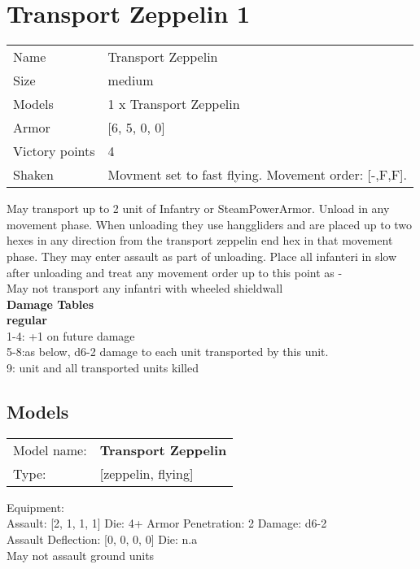 \clearpage

\section{ Transport Zeppelin 1 }

\begin{tabular}{ll}
  Name & Transport Zeppelin \\
  Size & medium\\
  Models & 1 x Transport Zeppelin\\
  Armor & [6, 5, 0, 0]\\
  Victory points & 4\\
  Shaken & Movment set to fast flying. Movement order: [-,F,F].\\
\end{tabular}

May transport up to 2 unit of Infantry or SteamPowerArmor. Unload in any movement phase. When unloading they use hanggliders and are placed up to two hexes in any direction from the transport zeppelin end hex in that movement phase. They may enter assault as part of unloading. Place all infanteri in slow after unloading and treat any movement order up to this point as -\\ 
May not transport any infantri with wheeled shieldwall\\ 



{\bf Damage Tables} \\
 {\bf regular } \\
1-4: +1 on future damage \\
5-8:as below, d6-2 damage to each unit transported by this unit. \\
9: unit and all transported units killed \\


\clearpage

\subsection{ Models }

\begin{tabular}{ll}
Model name: & {\bf Transport Zeppelin } \\
Type: & [zeppelin, flying] \\
\end{tabular}

Equipment:  \\

Assault: [2, 1, 1, 1] Die: 4+ Armor Penetration: 2 Damage: d6-2 \\
Assault Deflection: [0, 0, 0, 0] Die: n.a\\
\indent May not assault ground units\\ 
 




